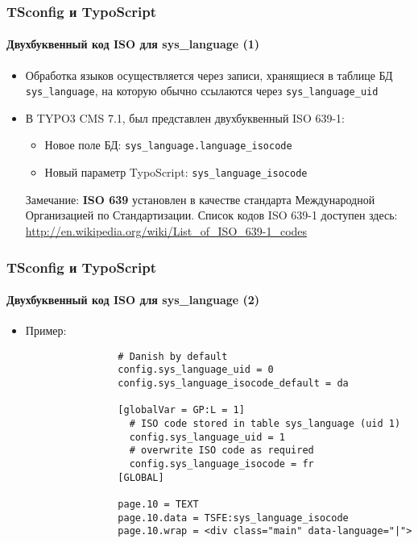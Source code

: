 \begin{frame}[fragile]
	\frametitle{TSconfig и TypoScript}
	\framesubtitle{Двухбуквенный код ISO для sys\_language (1)}

	\begin{itemize}
		\item Обработка языков осуществляется через записи, хранящиеся в таблице БД
			\texttt{sys\_language}, на которую обычно ссылаются через \texttt{sys\_language\_uid}
		\item В TYPO3 CMS 7.1, был представлен двухбуквенный ISO 639-1:

			\begin{itemize}
				\item Новое поле БД: \texttt{sys\_language.language\_isocode}
				\item Новый параметр TypoScript: \texttt{sys\_language\_isocode}
			\end{itemize}


		\vspace{1cm}

		\small
			Замечание: \textbf{ISO 639} установлен в качестве стандарта Международной Организацией по
			Стандартизации. Список кодов ISO 639-1 доступен здесь:\newline
			\url{http://en.wikipedia.org/wiki/List_of_ISO_639-1_codes}
		\normalsize

	\end{itemize}

\end{frame}


\begin{frame}[fragile]
	\frametitle{TSconfig и TypoScript}
	\framesubtitle{Двухбуквенный код ISO для sys\_language (2)}

	\begin{itemize}
		\item Пример:

			\begin{lstlisting}
				# Danish by default
				config.sys_language_uid = 0
				config.sys_language_isocode_default = da

				[globalVar = GP:L = 1]
				  # ISO code stored in table sys_language (uid 1)
				  config.sys_language_uid = 1
				  # overwrite ISO code as required
				  config.sys_language_isocode = fr
				[GLOBAL]

				page.10 = TEXT
				page.10.data = TSFE:sys_language_isocode
				page.10.wrap = <div class="main" data-language="|">
			\end{lstlisting}

	\end{itemize}

\end{frame}

